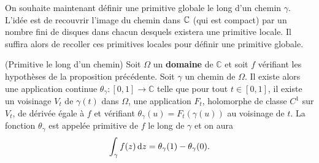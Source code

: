 On souhaite maintenant définir une primitive globale le long d'un chemin $\gamma$. L'idée est de recouvrir l'image du chemin dans $\mathbb{C}$ (qui est compact) par un nombre fini de disques dans chacun desquels existera une primitive locale. Il suffira alors de recoller ces primitives locales pour définir une primitive globale. 

\begin{fprop}(Primitive le long d'un chemin)
\label{prop:primitive_chemin}
Soit $\Omega$ un \textbf{domaine} de $\mathbb{C}$ et soit $f$ vérifiant les hypothèses
de la proposition précédente. Soit $\gamma$ un chemin de $\Omega$. Il existe
alors une application continue $\theta_\gamma \colon [0,1] \to \mathbb{C}$ telle 
que pour tout $t \in [0,1]$, il existe un voisinage $V_t$ de $\gamma(t)$
dans $\Omega$, une application $F_t$, holomorphe de classe $C^1$ sur $V_t$, de
dérivée égale à $f$ et vérifiant $\theta_\gamma(u)=F_t(\gamma(u))$ au voisinage de $t$. La fonction $\theta_\gamma$ est appelée primitive de $f$ le long de $\gamma$ et on aura
\[\int_{\gamma} f(z) \mathop{}\mathopen{}\mathrm{d} z = \theta_\gamma(1)-\theta_\gamma(0).\]
\end{fprop}

